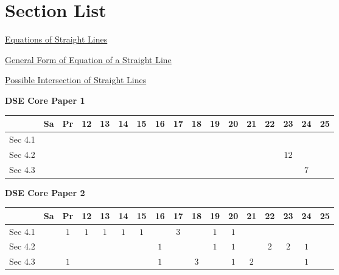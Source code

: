 \documentclass[12pt, a4paper]{article}
\begin{document}
\section*{Section List}
\begin{enumx}[label=Sec 4.\arabic*\ ]
\item \hyperref[section:4-4-1]{Equations of Straight Lines}
\item \hyperref[section:4-4-2]{General Form of Equation of a Straight Line}
\item \hyperref[section:4-4-3]{Possible Intersection of Straight Lines}
\end{enumx}
\begin{absolutelynopagebreak}
\begin{center}
\textbf{DSE Core Paper 1}
\end{center}
\begin{center}
\begin{tabular}{|l|c|c|c|c|c|c|c|c|c|c|c|c|c|c|c|c|}
\hline
        & Sa & Pr & 12 & 13 & 14 & 15 & 16 & 17 & 18 & 19 & 20 & 21 & 22 & 23 & 24 & 25 \\\hline\hline
Sec 4.1 &  &  &  &  &  &  &  &  &  &  &  &  &  &  &  &  \\\hline
Sec 4.2 &  &  &  &  &  &  &  &  &  &  &  &  &  &  $12$ &  &  \\\hline
Sec 4.3 &  &  &  &  &  &  &  &  &  &  &  &  &  &  &  $7$ &  \\\hline
\end{tabular}
\end{center}
\end{absolutelynopagebreak}
\begin{absolutelynopagebreak}
\begin{center}
\textbf{DSE Core Paper 2}
\end{center}
\begin{center}
\begin{tabular}{|l|c|c|c|c|c|c|c|c|c|c|c|c|c|c|c|c|}
\hline
        & Sa & Pr & 12 & 13 & 14 & 15 & 16 & 17 & 18 & 19 & 20 & 21 & 22 & 23 & 24 & 25 \\\hline\hline
Sec 4.1 &  &  $1$ &  $1$ &  $1$ &  $1$ &  $1$ &  &  $3$ &  &  $1$ &  $1$ &  &  &  &  &  \\\hline
Sec 4.2 &  &  &  &  &  &  &  $1$ &  &  &  $1$ &  $1$ &  &  $2$ &  $2$ &  $1$ &  \\\hline
Sec 4.3 &  &  $1$ &  &  &  &  &  $1$ &  &  $3$ &  &  $1$ &  $2$ &  &  &  $1$ &  \\\hline
\end{tabular}
\end{center}
\end{absolutelynopagebreak}
\end{document}

